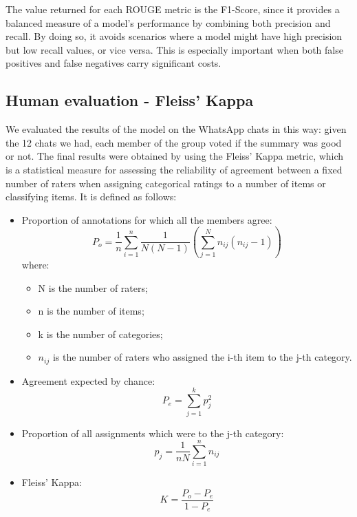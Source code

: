 \documentclass[10pt,twocolumn,letterpaper]{article}
\begin{document}
The value returned for each ROUGE metric is the F1-Score, since it provides a balanced measure of a model's performance by combining both precision and recall. By doing so, it avoids scenarios where a model might have high precision but low recall values, or vice versa. This is especially important when both false positives and false negatives carry significant costs.

\subsection{Human evaluation - Fleiss' Kappa}
We evaluated the results of the model on the WhatsApp chats in this way: given the 12 chats we had, each member of the group voted if the summary was good or not.
The final results were obtained by using the Fleiss' Kappa metric, which is a statistical measure for assessing the reliability of agreement between a fixed number of raters 
when assigning categorical ratings to a number of items or classifying items. 
It is defined as follows:
\begin{itemize}
    \item Proportion of annotations for which all the members agree:
    \begin{equation}
        P_o = \frac{1}{n} \sum_{i=1}^n \frac{1}{N(N-1)}(\sum_{j=1}^N n_{ij}(n_{ij} - 1))
    \end{equation}
    where:
    \begin{itemize}
        \item N is the number of raters;
        \item n is the number of items;
        \item k is the number of categories;
        \item $n_{ij}$ is the number of raters who assigned the i-th item to the j-th category.
    \end{itemize}
    \item Agreement expected by chance:
    \begin{equation}
        P_e = \sum_{j=1}^k p_j^2
    \end{equation}
    \item Proportion of all assignments which were to the j-th category:
    \begin{equation}
        p_j = \frac{1}{nN} \sum_{i=1}^n n_{ij}
    \end{equation}
    \item Fleiss' Kappa:
    \begin{equation}
        K = \frac{P_o - P_e}{1 - P_e}
    \end{equation}
\end{itemize}
\end{document}
